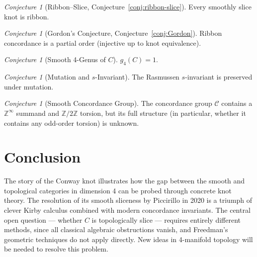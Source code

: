 \documentclass[12pt,a4paper]{amsart}
\theoremstyle{definition}
\theoremstyle{remark}
\newtheorem{conjecture}[theorem]{Conjecture}
\newcommand{\Z}{\mathbb{Z}}
\begin{document}
\begin{conjecture}[Ribbon--Slice, Conjecture~\ref{conj:ribbon-slice}]
Every smoothly slice knot is ribbon.
\end{conjecture}

\begin{conjecture}[Gordon's Conjecture, Conjecture~\ref{conj:Gordon}]
Ribbon concordance is a partial order (injective up to knot equivalence).
\end{conjecture}

\begin{conjecture}[Smooth 4-Genus of $C$]
$g_4(C) = 1$.
\end{conjecture}

\begin{conjecture}[Mutation and $s$-Invariant]
The Rasmussen $s$-invariant is preserved under mutation.
\end{conjecture}

\begin{conjecture}[Smooth Concordance Group]
The concordance group $\mathcal{C}$ contains a $\Z^\infty$ summand and
$\Z/2\Z$ torsion, but its full structure (in particular, whether it contains
any odd-order torsion) is unknown.
\end{conjecture}

\section{Conclusion}

The story of the Conway knot illustrates how the gap between the smooth and
topological categories in dimension 4 can be probed through concrete knot
theory. The resolution of its smooth sliceness by Piccirillo in 2020 is a
triumph of clever Kirby calculus combined with modern concordance invariants.
The central open question — whether $C$ is topologically slice — requires
entirely different methods, since all classical algebraic obstructions vanish,
and Freedman's geometric techniques do not apply directly. New ideas in
4-manifold topology will be needed to resolve this problem.
\end{document}
